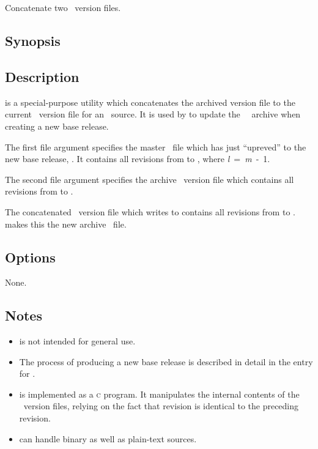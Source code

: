 \newpage
\section{}
\label{rcscat}
 
Concatenate two \rcs\ version files.

\subsection*{Synopsis}
 
\begin{synopsis}
\end{synopsis}
 
\subsection*{Description}
 
 is a special-purpose utility which concatenates the archived \rcs
version file to the current \rcs\ version file for an \aipspp\ source.  It is
used by  to update the \aipspp\ \rcs\ archive when creating a
new base release.

The first file argument specifies the master \rcs\ file which 
has just ``upreved'' to the new base release, .  It
contains all revisions from  to ,
where \textit{l}~=~\textit{m}~-~1.

The second file argument specifies the archive \rcs\ version file which
contains all revisions from  to .  

The concatenated \rcs\ version file which  writes to 
contains all revisions from  to .
 makes this the new archive \rcs\ file.
 
\subsection*{Options}
 
None.

\subsection*{Notes}
 
\begin{itemize}
\item
    is not intended for general use.

\item
   The process of producing a new base release is described in detail in the
   entry for .

\item
    is implemented as a \textsc{c} program.  It manipulates the
   internal contents of the \rcs\ version files, relying on the fact that
   revision  is identical to the preceding revision.

\item
    can handle binary as well as plain-text sources.
\end{itemize}

